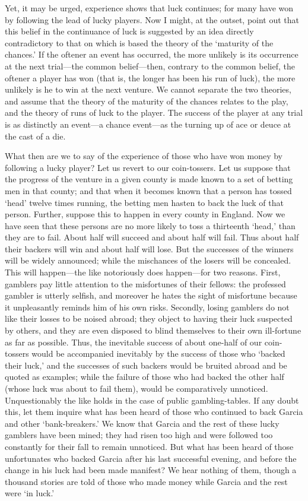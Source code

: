 \documentclass[letterpaper,12pt,oneside,openany]{memoir}
\begin{document}
Yet, it may be urged, experience shows that luck
continues; for many have won by following the lead
of lucky players. Now I might, at the outset, point
out that this belief in the continuance of luck is
suggested by an idea directly contradictory to that on
which is based the theory of the `maturity of the
chances.' If the oftener an event has occurred, the
more unlikely is its occurrence at the next trial---the
common belief---then, contrary to the common
belief, the oftener a player has won (that is, the
longer has been his run of luck), the more unlikely is
he to win at the next venture. We cannot separate
the two theories, and assume that the theory of the
maturity of the chances relates to the play, and the
theory of runs of luck to the player. The success of
the player at any trial is as distinctly an event---a
chance event---as the turning up of ace or deuce at the
cast of a die.

What then are we to say of the experience of those
who have won money by following a lucky player?
Let us revert to our coin-tossers. Let us suppose that
the progress of the venture in a given county is made
known to a set of betting men in that county; and
that when it becomes known that a person has tossed
`head' twelve times running, the betting men hasten
to back the luck of that person. Further, suppose this
to happen in every county in England. Now we have
seen that these persons are no more likely to toss a
thirteenth `head,' than they are to fail. About half
will succeed and about half will fail. Thus about half
their backers will win and about half will lose. But
the successes of the winners will be widely announced;
while the mischances of the losers will be concealed.
This will happen---the like notoriously does happen---for
two reasons. First, gamblers pay little attention
to the misfortunes of their fellows: the professed
gambler is utterly selfish, and moreover he hates the
sight of misfortune because it unpleasantly reminds
him of his own risks. Secondly, losing gamblers do
not like their losses to be noised abroad; they object
to having their luck suspected by others, and they are
even disposed to blind themselves to their own ill-fortune
as far as possible. Thus, the inevitable
success of about one-half of our coin-tossers would be
accompanied inevitably by the success of those who
`backed their luck,' and the successes of such backers
would be bruited abroad and be quoted as examples;
while the failure of those who had backed the other
half (whose luck was about to fail them), would be
comparatively unnoticed. Unquestionably the like
holds in the case of public gambling-tables. If any
doubt this, let them inquire what has been heard of
those who continued to back Garcia and other `bank-breakers.'
We know that Garcia and the rest of these
lucky gamblers have been mined; they had risen too
high and were followed too constantly for their fall to
remain unnoticed. But what has been heard of those
unfortunates who backed Garcia after his last successful
evening, and before the change in his luck had been
made manifest? We hear nothing of them, though a
thousand stories are told of those who made money
while Garcia and the rest were `in luck.'
\end{document}
